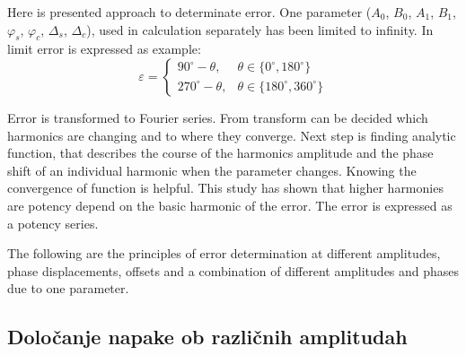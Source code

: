 \documentclass[a4paper]{article}
\begin{document}
Here is presented approach to determinate error. One parameter ($A_0$, $B_0$, $A_1$, $B_1$, $\varphi_{s}$, $\varphi_{c}$, $\Delta_s$, $\Delta_c$), used in calculation separately has been limited to infinity.
In limit error is expressed as example:
\begin{equation}
\label{equ:def_err_inf}
\varepsilon=
\begin{cases}
90^\circ-\theta, & \theta \in \{0^\circ,180^\circ\}\\
270^\circ-\theta, & \theta \in \{180^\circ,360^\circ\}
\end{cases}
\end{equation}

Error is transformed to Fourier series. From transform can be decided which harmonics are changing and to where they converge. Next step is finding analytic function, that describes the course of the harmonics amplitude and the phase shift of an individual harmonic when the parameter changes. Knowing the convergence of function is helpful. This study has shown that higher harmonies are potency depend on the basic harmonic of the error. The error is expressed as a potency series.

The following are the principles of error determination at different amplitudes, phase displacements, offsets and a combination of different amplitudes and phases due to one parameter.

\subsection{Določanje napake ob različnih amplitudah}
\end{document}
